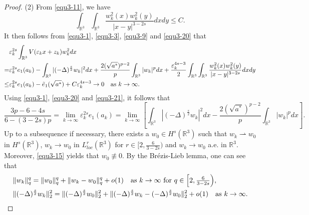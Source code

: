 \documentclass[reqno, 11pt]{amsart} %
\numberwithin{equation}{section}
\begin{document}
\begin{proof}
		(2) From \eqref{equ3-11}, we have
		\begin{equation}\label{equ3-20}
			\int_{\mathbb{R}^{3}}\int_{\mathbb{R}^{3}}\frac{w_{k}^{2}(x)w_{k}^{2}(y)}{|x-y|^{3-2s}}dxdy\leq  C.
		\end{equation}
		It then follows from \eqref{equ3-1}, \eqref{equ3-3}, \eqref{equ3-9} and \eqref{equ3-20} that
		\begin{equation}\label{equ3-21}
			\begin{split}
				&	\varepsilon_{k}^{2s}\int_{\mathbb{R}^{3}}V(\varepsilon_{k}x+z_{k})w_{k}^{2}dx\\
				=&\varepsilon_{k}^{2s}e_{1}(a_{k})-\int_{\mathbb{R}^{3}}|(-\Delta)^{\frac{s}{2}} w_{k}|^{2}dx+\frac{2(\sqrt{a^{\ast}})^{p-2}}{p}\int_{\mathbb{R}^{3}}|w_{k}|^{p}dx+\frac{\varepsilon_{k}^{4s-3}}{2}\int_{\mathbb{R}^{3}}\int_{\mathbb{R}^{3}}\frac{w_{k}^{2}(x)w_{k}^{2}(y)}{|x-y|^{3-2s}}dxdy\\
				\leq&\varepsilon_{k}^{2s}e_{1}(a_{k})-\tilde{e}_{1}(\sqrt{a^{\ast}})+C\varepsilon_{k}^{4s-3}\rightarrow0\quad \hbox{as $k\rightarrow\infty$}.
			\end{split}
		\end{equation}
		Using \eqref{equ3-1}, \eqref{equ3-20} and \eqref{equ3-21}, it follows that
		\begin{equation}\label{equ3-22}
			\frac{3p-6-4s}{6-(3-2s)p}=\lim_{k\rightarrow\infty}\varepsilon_{k}^{2s}e_{1}(a_{k})=\lim_{k\rightarrow\infty}\left[\int_{\mathbb{R}^{3}}|(-\Delta)^{\frac{s}{2}} w_{k}|^{2}dx-\frac{2(\sqrt{a^{\ast}})^{p-2}}{p}\int_{\mathbb{R}^{3}}|w_{k}|^{p}dx \right].
		\end{equation}
		Up to a subsequence if necessary, there exists a $w_{0}\in H^{s}(\mathbb{R}^{3})$ such that $w_{k}\rightharpoonup w_{0}$ in $H^{s}(\mathbb{R}^{3})$, $w_{k}\rightarrow w_{0}$ in $L^{r}_{loc}(\mathbb{R}^{3})$ \rm for $r\in[2, \frac{6}{3-2s})$ and $w_{k}\rightarrow w_{0}$ a.e. in $\mathbb{R}^{3}$. Moreover,  \eqref{equ3-15} yields that $w_{0}\not\equiv0$. By the Br\'{e}zis-Lieb lemma, one can see that
		\begin{equation}\label{equ3-23}
			\begin{split}
				&	\|w_{k}\|_{q}^{q}=\|w_{0}\|_{q}^{q}+\|w_{k}-w_{0}\|_{q}^{q}+o(1)\quad \hbox{as $k\rightarrow\infty$ for $q\in \left[ 2, \frac{6}{3-2s}\right) $}, \\
				&	\|(-\Delta)^{\frac{s}{2}} w_{k}\|_{2}^{2}=\|(-\Delta)^{\frac{s}{2}} w_{0}\|_{2}^{2}+\|(-\Delta)^{\frac{s}{2}}w_{k}-(-\Delta)^{\frac{s}{2}} w_{0}\|_{2}^{2}+o(1)\quad \hbox{as $k\rightarrow\infty$}.

\end{split}
\end{equation}
\end{proof}
\end{document}
